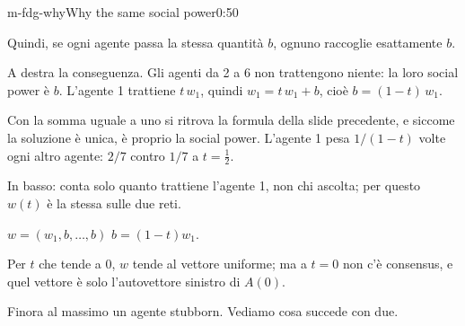 \begin{slide}{m-fdg-why}{Why the same social power}{0:50 {\color{red}}}
\begin{discorso}
    \item {\color{blue}Quindi, se ogni agente passa la stessa quantità $b$, ognuno raccoglie esattamente $b$.}
    \item {\color{blue}A destra la conseguenza. Gli agenti da 2 a 6 non trattengono niente: la loro social power è $b$. L'agente 1 trattiene $t\,w_1$, quindi $w_1=t\,w_1+b$, cioè $b=(1-t)\,w_1$.}
    \item {\color{blue}Con la somma uguale a uno si ritrova la formula della slide precedente, e siccome la soluzione è unica, è proprio la social power. L'agente 1 pesa $1/(1-t)$ volte ogni altro agente: $2/7$ contro $1/7$ a $t=\tfrac12$.}
    \item {\color{blue}In basso: conta solo quanto trattiene l'agente 1, non chi ascolta; per questo $w(t)$ è la stessa sulle due reti.}
    \item {\color{red}      } {\color{red}$w=(w_1,b,\dots,b)$} {\color{red} } {\color{red}$b=(1-t)w_1$.}
    \item Per $t$ che tende a 0, $w$ tende al vettore uniforme; ma a $t=0$ non c'è {\color{red}} {\color{blue}consensus,} e quel vettore è solo l'autovettore sinistro di $A(0)$.
    \item Finora al massimo un agente stubborn. Vediamo cosa succede con due.
  \end{discorso}
\end{slide}

